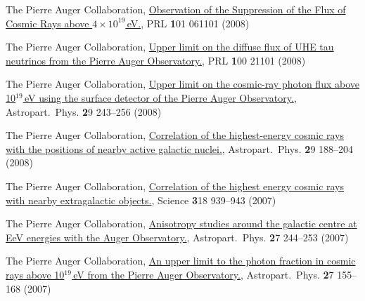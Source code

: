 \begin{etaremune}
\item {}The Pierre Auger Collaboration,
\href{http://dx.doi.org/10.1103/PhysRevLett.101.061101}{{Observation of
the Suppression of the Flux of Cosmic Rays above $4\times10^{19}$\,eV.}}, PRL
{\textbf 101} 061101 (2008)

\item {}The Pierre Auger Collaboration,
\href{http://dx.doi.org/10.1103/PhysRevLett.100.211101}{{Upper limit on
the diffuse flux of UHE tau neutrinos from the Pierre Auger Observatory.}}, PRL
{\textbf 100} 21101 (2008)

\item {}The Pierre Auger Collaboration,
\href{http://dx.doi.org/10.1016/j.astropartphys.2008.01.003}{{Upper limit
on the cosmic-ray photon flux above 10$^{19}$\,eV using the surface detector of
the Pierre Auger Observatory.}}, Astropart.\ Phys. {\textbf 29} 243--256 (2008)

\item {}The Pierre Auger Collaboration,
\href{http://dx.doi.org/10.1016/j.astropartphys.2008.01.002}{{Correlation
of the highest-energy cosmic rays with the positions of nearby active galactic
nuclei.}}, Astropart.\ Phys. {\textbf 29} 188--204 (2008)

\item {}The Pierre Auger Collaboration,
\href{http://dx.doi.org/10.1126/science.1151124}{{Correlation of the
highest energy cosmic rays with nearby extragalactic objects.}}, Science {\textbf
318} 939--943 (2007)

\item {}The Pierre Auger Collaboration,
\href{http://dx.doi.org/10.1016/j.astropartphys.2006.11.002}{{Anisotropy
studies around the galactic centre at EeV energies with the Auger
Observatory.}},  Astropart.\ Phys. {\textbf 27} 244--253 (2007)

\item {}The Pierre Auger Collaboration,
\href{http://dx.doi.org/10.1016/j.astropartphys.2006.10.004}{{An upper
limit to the photon fraction in cosmic rays above 10$^{19}$\,eV from the Pierre
Auger Observatory.}}, Astropart.\ Phys. {\textbf 27} 155--168 (2007)
\end{etaremune}
